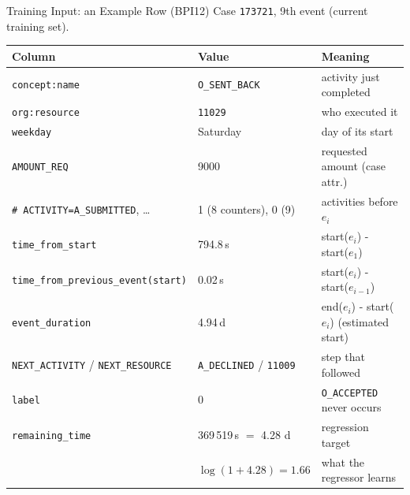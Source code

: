\documentclass[aspectratio=169]{beamer} %
\begin{document}
\begin{frame}{Training Input: an Example Row (BPI12)}
  \small
  Case \texttt{173721}, 9th event (current training set).
  \begin{center}
  \scriptsize
  \begin{tabular}{lll}
    \toprule
    \textbf{Column} & \textbf{Value} & \textbf{Meaning} \\
    \midrule
    \texttt{concept:name}      & \texttt{O\_SENT\_BACK} & activity just completed \\
    \texttt{org:resource}      & \texttt{11029}  & who executed it \\
    \texttt{weekday}           & Saturday        & day of its start \\
    \texttt{AMOUNT\_REQ}       & 9000            & requested amount (case attr.) \\
    \texttt{\# ACTIVITY=A\_SUBMITTED}, \dots & 1 (8 counters), 0 (9) & activities before $e_i$ \\
    \texttt{time\_from\_start} & 794.8\,s & start($e_i$) - start($e_1$) \\
    \texttt{time\_from\_previous\_event(start)} & 0.02\,s & start($e_i$) - start($e_{i-1}$) \\
    \texttt{event\_duration}   & 4.94\,d & end($e_i$)  - start($e_i$) (estimated start) \\
    \midrule
    \texttt{NEXT\_ACTIVITY} / \texttt{NEXT\_RESOURCE} & \texttt{A\_DECLINED} / \texttt{11009} & step that followed \\
    \midrule
    \texttt{label}            & 0     & \texttt{O\_ACCEPTED} never occurs \\
    \texttt{remaining\_time}  & 369\,519\,s $=$ 4.28 d & regression target \\
     & $\log(1 + 4.28) = 1.66$ & what the regressor learns \\
    \bottomrule
  \end{tabular}
  \end{center}
\end{frame}
\end{document}
